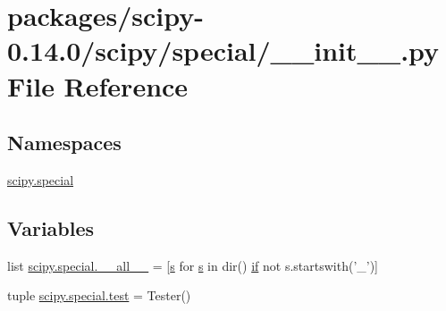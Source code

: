 \hypertarget{packages_2scipy-0_814_80_2scipy_2special_2____init_____8py}{}\section{packages/scipy-\/0.14.0/scipy/special/\+\_\+\+\_\+init\+\_\+\+\_\+.py File Reference}
\label{packages_2scipy-0_814_80_2scipy_2special_2____init_____8py}
\subsection*{Namespaces}
\begin{DoxyCompactItemize}
\item 
 \hyperlink{namespacescipy_1_1special}{scipy.\+special}
\end{DoxyCompactItemize}
\subsection*{Variables}
\begin{DoxyCompactItemize}
\item 
list \hyperlink{namespacescipy_1_1special_aec366720a01dcdb5739dbba9d6b53c2f}{scipy.\+special.\+\_\+\+\_\+all\+\_\+\+\_\+} = \mbox{[}\hyperlink{indexexpr_8h_ae024b0db549122b44c349ae28ec990dc}{s} for \hyperlink{indexexpr_8h_ae024b0db549122b44c349ae28ec990dc}{s} in dir() \hyperlink{minmax_8h_a30a0ee9fee303f01d9c5e6f669e0dfe9}{if} not s.\+startswith('\+\_\+')\mbox{]}
\item 
tuple \hyperlink{namespacescipy_1_1special_ac968122277b6602565fea595d4d60936}{scipy.\+special.\+test} = Tester()
\end{DoxyCompactItemize}
